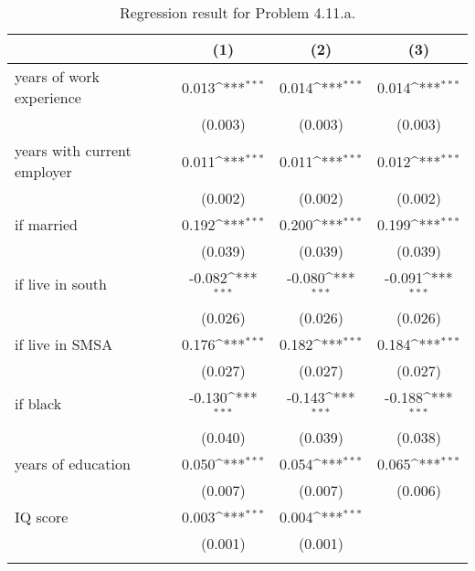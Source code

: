 \begin{table}[htbp]\centering
\def\sym#1{\ifmmode^{#1}\else\(^{#1}\)\fi}
\caption{Regression result for Problem 4.11.a. \label{reg1}}
\begin{tabular}{l*{3}{c}}
\toprule
                    &\multicolumn{1}{c}{(1)}         &\multicolumn{1}{c}{(2)}         &\multicolumn{1}{c}{(3)}         \\
\midrule
years of work experience&       0.013\sym{***}&       0.014\sym{***}&       0.014\sym{***}\\
                    &     (0.003)         &     (0.003)         &     (0.003)         \\
\addlinespace
years with current employer&       0.011\sym{***}&       0.011\sym{***}&       0.012\sym{***}\\
                    &     (0.002)         &     (0.002)         &     (0.002)         \\
\addlinespace
=1 if married       &       0.192\sym{***}&       0.200\sym{***}&       0.199\sym{***}\\
                    &     (0.039)         &     (0.039)         &     (0.039)         \\
\addlinespace
=1 if live in south &      -0.082\sym{***}&      -0.080\sym{***}&      -0.091\sym{***}\\
                    &     (0.026)         &     (0.026)         &     (0.026)         \\
\addlinespace
=1 if live in SMSA  &       0.176\sym{***}&       0.182\sym{***}&       0.184\sym{***}\\
                    &     (0.027)         &     (0.027)         &     (0.027)         \\
\addlinespace
=1 if black         &      -0.130\sym{***}&      -0.143\sym{***}&      -0.188\sym{***}\\
                    &     (0.040)         &     (0.039)         &     (0.038)         \\
\addlinespace
years of education  &       0.050\sym{***}&       0.054\sym{***}&       0.065\sym{***}\\
                    &     (0.007)         &     (0.007)         &     (0.006)         \\
\addlinespace
IQ score            &       0.003\sym{***}&       0.004\sym{***}&                     \\
                    &     (0.001)         &     (0.001)         &                     \\
\addlinespace

\end{tabular}
\end{table}
